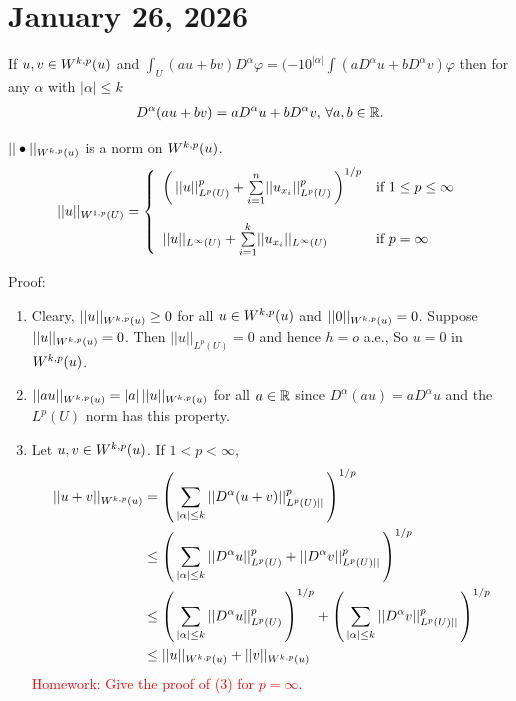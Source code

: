 \documentclass[12pt,a4paper]{report}
\newcommand{\RED}[1]{\textcolor{red}{#1}}
\begin{document}
\HLINE
\section*{January 26, 2026}

\newcommand{\SSPACEX}{\SSPACE{k}{p}{u}}
\begin{theorem}

If $u,v \in \SSPACEX$ and $\int_U(au+bv)D^\alpha\varphi = (-10^{|\alpha|}\int(aD^\alpha u+bD^\alpha v)\varphi$ then for any $\alpha$ with $|\alpha|\le k$
\begin{align*}
	D^\alpha(au+bv)=aD^\alpha u+ b D^\alpha v, \, \forall a,b \in \mathbb{R}.
\end{align*}
\end{theorem}

\begin{theorem}

$||\bullet||_\SSPACEX$ is a norm on $\SSPACEX$. 
\begin{align*}
		||u||_{{W^{1,p}(U)}} = \left \{ \begin{array}{ll} \left (\, ||u||^p_{L^p(U)} + \underset{i=1}{\overset{n}{\sum}} ||u_{x_i}||^p_{L^p(U)} \,\right )^{1/p} & \text{if } 1\le p\le \infty \\\\ ||u||_{L^\infty(U)} + \underset{i=1}{\overset{k}{\sum}} ||u_{x_i}||_{L^\infty(U)} & \text{if }p = \infty \end{array} \right .
\end{align*}

Proof: \begin{enumerate}
\item Cleary, $||u||_\SSPACEX \ge 0$ for all $u \in \SSPACEX$ and $||0||_\SSPACEX = 0$.  Suppose $||u||_\SSPACEX = 0$.  Then $||u||_{L^p(U)} = 0$ and hence $h=o$ a.e.,  So $u=0$ in $\SSPACEX$.

\item $||au||_\SSPACEX = |a|\,||u||_\SSPACEX$ for all $a \in \mathbb{R}$ since $D^\alpha(au)=a D^\alpha u$ and the $L^p(U)$ norm has this property.

\item Let $u,v \in \SSPACEX$.  If $1<p<\infty$, 
\begin{align*}
	||u+v||_\SSPACEX &= \PAREN{\sum_{|\alpha| \le k} ||D^\alpha(u+v)||^p_{L^p(U)||}}^{1/p} \\
	&\le \PAREN{\sum_{|\alpha| \le k} ||D^\alpha u||^p_{L^p(U)}+||D^\alpha v||^p_{L^p(U)||}}^{1/p} \\
	&\le \PAREN{\sum_{|\alpha| \le k} ||D^\alpha u||^p_{L^p(U)}}^{1/p}+\PAREN{\sum_{|\alpha| \le k}||D^\alpha v||^p_{L^p(U)||}}^{1/p} \\
	&\le ||u||_\SSPACEX + ||v||_\SSPACEX
\end{align*}\RED{Homework: Give the proof of (3) for $p=\infty$.}
\end{enumerate}
\end{theorem}
\end{document}
